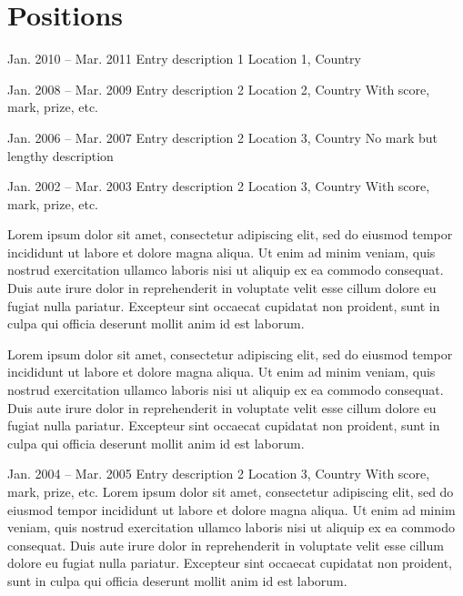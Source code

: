 
\section{Positions}%
    
\begin{cventries}[left]

    \cventry
    {Jan. 2010 -- Mar. 2011}%
    {Entry description 1}%
    {Location 1, Country}%
    {}%
    {}%

    \cventry
    {Jan. 2008 -- Mar. 2009}%
    {Entry description 2}%
    {Location 2, Country}%
    {With score, mark, prize, etc.}%
    {}%

    \cventry
    {Jan. 2006 -- Mar. 2007}%
    {Entry description 2}%
    {Location 3, Country}%
    {}%
    {No mark but lengthy description}%

    \cventry
    {Jan. 2002 -- Mar. 2003}%
    {Entry description 2}%
    {Location 3, Country}%
    {With score, mark, prize, etc.}%
    {%
        \begin{cvitems}%
            \item Lorem ipsum dolor sit amet, consectetur adipiscing elit, sed do eiusmod tempor incididunt ut labore et dolore magna aliqua. Ut enim ad minim veniam, quis nostrud exercitation ullamco laboris nisi ut aliquip ex ea commodo consequat. Duis aute irure dolor in reprehenderit in voluptate velit esse cillum dolore eu fugiat nulla pariatur. Excepteur sint occaecat cupidatat non proident, sunt in culpa qui officia deserunt mollit anim id est laborum.
            \item Lorem ipsum dolor sit amet, consectetur adipiscing elit, sed do eiusmod tempor incididunt ut labore et dolore magna aliqua. Ut enim ad minim veniam, quis nostrud exercitation ullamco laboris nisi ut aliquip ex ea commodo consequat. Duis aute irure dolor in reprehenderit in voluptate velit esse cillum dolore eu fugiat nulla pariatur. Excepteur sint occaecat cupidatat non proident, sunt in culpa qui officia deserunt mollit anim id est laborum.
        \end{cvitems}%
    }%
    
    \cventry
    {Jan. 2004 -- Mar. 2005}%
    {Entry description 2}%
    {Location 3, Country}%
    {With score, mark, prize, etc.}%
    {Lorem ipsum dolor sit amet, consectetur adipiscing elit, sed do eiusmod tempor incididunt ut labore et dolore magna aliqua. Ut enim ad minim veniam, quis nostrud exercitation ullamco laboris nisi ut aliquip ex ea commodo consequat. Duis aute irure dolor in reprehenderit in voluptate velit esse cillum dolore eu fugiat nulla pariatur. Excepteur sint occaecat cupidatat non proident, sunt in culpa qui officia deserunt mollit anim id est laborum.}

\end{cventries}


